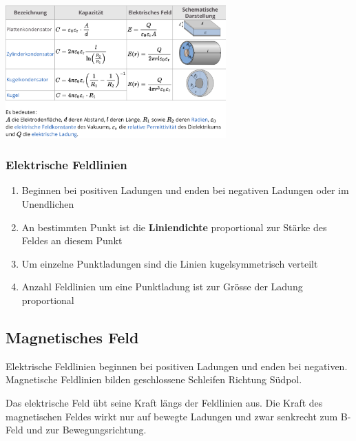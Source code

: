\documentclass[7pt]{article}
\begin{document}
\begin{multicols*}{3}
\includegraphics[width=240pt]{images/mf/capacitor_formulas}

\subsubsection{Elektrische Feldlinien}

\begin{enumerate}[noitemsep]
	\item Beginnen bei positiven Ladungen und enden bei negativen Ladungen oder im Unendlichen
	\item An bestimmten Punkt ist die \textbf{Liniendichte} proportional zur St{\"a}rke des Feldes an diesem Punkt
	\item Um einzelne Punktladungen sind die Linien kugelsymmetrisch verteilt
	\item Anzahl Feldlinien um eine Punktladung ist zur Gr{\"o}sse der Ladung proportional
\end{enumerate}

\subsection{Magnetisches Feld}

\begin{description}[labelindent=16pt,style=multiline,leftmargin=2.5cm, noitemsep]
	\item[Richtung:] Elektrische Feldlinien beginnen bei positiven Ladungen und enden bei negativen.\newline
		Magnetische Feldlinien bilden geschlossene Schleifen Richtung S{\"u}dpol.
	\item[Kraft:] Das elektrische Feld {\"u}bt seine Kraft l{\"a}ngs der Feldlinien aus. \newline
				 Die Kraft des magnetischen Feldes wirkt nur auf bewegte Ladungen und zwar senkrecht zum B-Feld und zur Bewegungsrichtung.
\end{description}


\end{multicols*}
\end{document}
